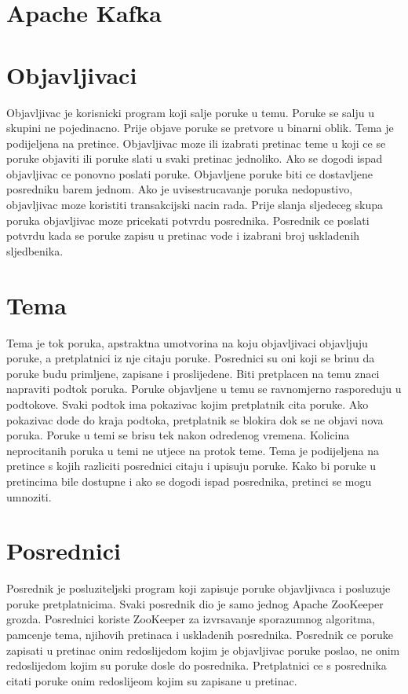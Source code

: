 \documentclass[times, utf8, diplomski, numeric]{fer}
\begin{document}
\chapter{Apache Kafka}



\chapter{Objavljivaci}
Objavljivac je korisnicki program koji salje poruke u temu. Poruke se salju u skupini ne pojedinacno. Prije objave poruke se pretvore u binarni oblik. Tema je podijeljena na pretince. Objavljivac moze ili izabrati pretinac teme u koji ce se poruke objaviti ili poruke slati u svaki pretinac jednoliko. Ako se dogodi ispad objavljivac ce ponovno poslati poruke. Objavljene poruke biti ce dostavljene posredniku barem jednom. Ako je uvisestrucavanje poruka nedopustivo, objavljivac moze koristiti transakcijski nacin rada. Prije slanja sljedeceg skupa poruka objavljivac moze pricekati potvrdu posrednika. Posrednik ce poslati potvrdu kada se poruke zapisu u pretinac vode i izabrani broj uskladenih sljedbenika.



\chapter{Tema}
Tema je tok poruka, apstraktna umotvorina na koju objavljivaci objavljuju poruke, a pretplatnici iz nje citaju poruke. Posrednici su oni koji se brinu da poruke budu primljene, zapisane i proslijedene. Biti pretplacen na temu znaci napraviti podtok poruka. Poruke objavljene u temu se ravnomjerno rasporeduju u podtokove. Svaki podtok ima pokazivac kojim pretplatnik cita poruke. Ako pokazivac dode do kraja podtoka, pretplatnik se blokira dok se ne objavi nova poruka. Poruke u temi se brisu tek nakon odredenog vremena. Kolicina neprocitanih poruka u temi ne utjece na protok teme. Tema je podijeljena na pretince s kojih razliciti posrednici citaju i upisuju poruke. Kako bi poruke u pretincima bile dostupne i ako se dogodi ispad posrednika, pretinci se mogu umnoziti.



\chapter{Posrednici}
Posrednik je posluziteljski program koji zapisuje poruke objavljivaca i posluzuje poruke pretplatnicima. Svaki posrednik dio je samo jednog Apache ZooKeeper grozda. Posrednici koriste ZooKeeper za izvrsavanje sporazumnog algoritma, pamcenje tema, njihovih pretinaca i uskladenih posrednika. Posrednik ce poruke zapisati u pretinac onim redoslijedom kojim je objavljivac poruke poslao, ne onim redoslijedom kojim su poruke dosle do posrednika. Pretplatnici ce s posrednika citati poruke onim redoslijeom kojim su zapisane u pretinac.
\end{document}
